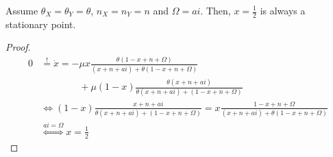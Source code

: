 Assume $\theta_X = \theta_Y = \theta$, $n_X = n_Y = n$ and $\Omega = ai$. Then, $x = \frac{1}{2}$ is always a stationary point.
\begin{proof}
	\begin{align*}
		0 &\overset{!}{=}\dot{x} = -\mu x\frac{\theta(1-x+n+\Omega)}{(x+n+ai) + \theta(1-x+n+\Omega)}\\
		&\qquad\qquad+ \mu \left(1-x\right)\frac{\theta (x+ n+ ai)}{\theta (x + n + ai) + (1-x + n + \Omega)}\\
		& \Leftrightarrow \left(1-x\right)\frac{x+ n+ ai}{\theta (x + n + ai) + (1-x + n + \Omega)} = x\frac{1-x+n+\Omega}{(x+n+ai) + \theta(1-x+n+\Omega)}\\
		&\overset{ai = \Omega}{\Leftrightarrow} x = \frac{1}{2}
	\end{align*}
\end{proof}